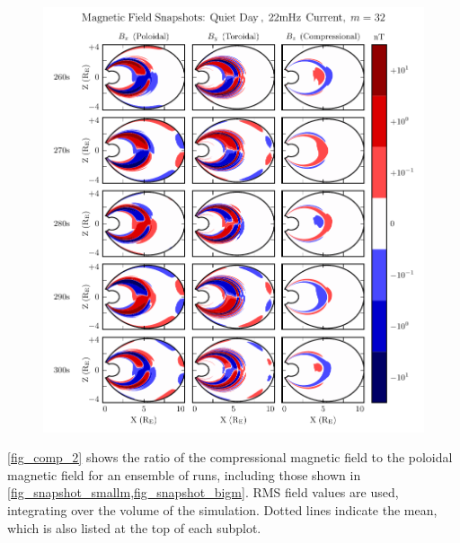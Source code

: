 \begin{figure}[!htb]
    \centering
    \includegraphics[width=\textwidth]{figures/snapshot_bigm.pdf}
    \caption[Magnetic Field Snapshots from a Large-\azm Run]{
      \todo{$\cdots$}
    }
    \label{fig_snapshot_bigm}
\end{figure}

\cref{fig_comp_2} shows the ratio of the compressional magnetic field to the poloidal magnetic field for an ensemble of runs, including those shown in \cref{fig_snapshot_smallm,fig_snapshot_bigm}. RMS field values are used, integrating over the volume of the simulation. Dotted lines indicate the mean, which is also listed at the top of each subplot. 



